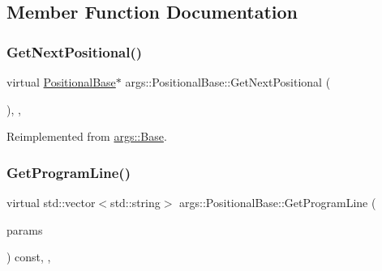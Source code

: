 \subsection{Member Function Documentation}
\mbox{\label{classargs_1_1_positional_base_aaaf09006fd551306b979ea026c49bddb}} 
\subsubsection{\texorpdfstring{Get\+Next\+Positional()}{GetNextPositional()}}
{\footnotesize\ttfamily virtual \hyperlink{classargs_1_1_positional_base}{Positional\+Base}$\ast$ args\+::\+Positional\+Base\+::\+Get\+Next\+Positional (\begin{DoxyParamCaption}{ }\end{DoxyParamCaption})\hspace{0.3cm}{\ttfamily [inline]}, {\ttfamily [override]}, {\ttfamily [virtual]}}



Reimplemented from \hyperlink{classargs_1_1_base_a3e5ad8516fd2037496cd39bcb3b10f9d}{args\+::\+Base}.

\mbox{\label{classargs_1_1_positional_base_a5bf0bc66f4b8cc5aa414fe8976ab8129}} 
\subsubsection{\texorpdfstring{Get\+Program\+Line()}{GetProgramLine()}}
{\footnotesize\ttfamily virtual std\+::vector$<$std\+::string$>$ args\+::\+Positional\+Base\+::\+Get\+Program\+Line (\begin{DoxyParamCaption}\item[{const \hyperlink{structargs_1_1_help_params}{Help\+Params} \&}]{params }\end{DoxyParamCaption}) const\hspace{0.3cm}{\ttfamily [inline]}, {\ttfamily [override]}, {\ttfamily [virtual]}}



